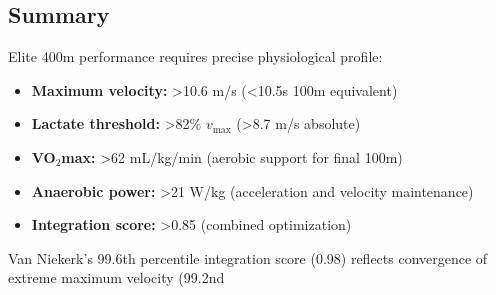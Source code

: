 \subsection{Summary}

Elite 400m performance requires precise physiological profile:
\begin{itemize}
    \item \textbf{Maximum velocity:} >10.6 m/s (<10.5s 100m equivalent)
    \item \textbf{Lactate threshold:} >82\% $v_{\max}$ (>8.7 m/s absolute)
    \item \textbf{VO$_2$max:} >62 mL/kg/min (aerobic support for final 100m)
    \item \textbf{Anaerobic power:} >21 W/kg (acceleration and velocity maintenance)
    \item \textbf{Integration score:} >0.85 (combined optimization)
\end{itemize}

Van Niekerk's 99.6th percentile integration score (0.98) reflects convergence of extreme maximum velocity (99.2nd %
